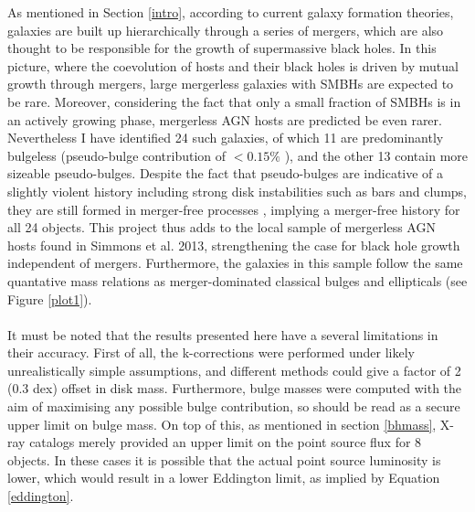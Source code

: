 \documentclass[11pt,twocolumn]{article}
\begin{document}
As mentioned in Section \ref{intro}, according to current galaxy formation theories, galaxies are built up hierarchically through a series of mergers, which are also thought to be responsible for the growth of supermassive black holes. In this picture, where the coevolution of hosts and their black holes is driven by mutual growth through mergers, large mergerless galaxies with SMBHs are expected to be rare. Moreover, considering the fact that only a small fraction of SMBHs is in an actively growing phase, mergerless AGN hosts are predicted be even rarer. Nevertheless I have identified 24 such galaxies, of which 11 are predominantly bulgeless (pseudo-bulge contribution of $ < 0.15 \% $ ), and the other 13 contain more sizeable pseudo-bulges. Despite the fact that pseudo-bulges are indicative of a slightly violent history including strong disk instabilities such as bars and clumps, they are still formed in merger-free processes \cite{2012ApJ...756...26M}, implying a merger-free history for all 24 objects. This project thus adds to the local sample of mergerless AGN hosts found in Simmons et al. 2013, strengthening the case for black hole growth independent of mergers. Furthermore, the galaxies in this sample follow the same quantative mass relations as merger-dominated classical bulges and ellipticals (see Figure \ref{plot1}).
\paragraph{} It must be noted that the results presented here have a several limitations in their accuracy. First of all, the k-corrections  were performed under likely unrealistically simple assumptions, and different methods could give a factor of 2 (0.3 dex) offset in disk mass. Furthermore, bulge masses were computed with the aim of maximising any possible bulge contribution, so should be read as a secure upper limit on bulge mass. On top of this, as mentioned in section \ref{bhmass}, X-ray catalogs merely  provided an upper limit on the point source flux for 8 objects. In these cases it is possible that the actual point source luminosity is lower, which would result in a lower Eddington limit, as implied by Equation \ref{eddington}.
\end{document}
